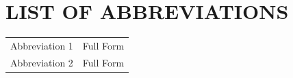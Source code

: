\chapter*{LIST OF ABBREVIATIONS}

\begin{tabular}{ll}
	Abbreviation 1 & Full Form \\
	Abbreviation 2 & Full Form \\
\end{tabular}

\clearpage

